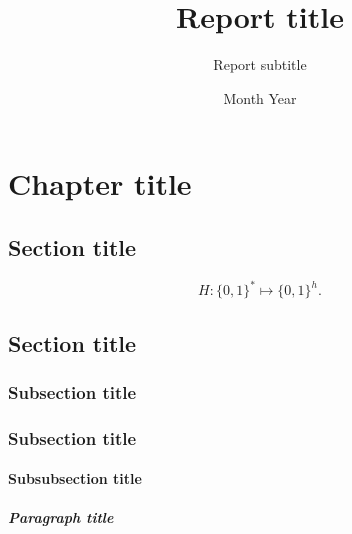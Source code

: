 \documentclass{enisareport}
\title{ Report title }
\subtitle{ Report subtitle }
\date{Month Year}
\theoremstyle{plain}
\theoremstyle{definition}
\begin{document}
\maketitle

\tableofcontents

\chapter{Chapter title}\label{chap1}

\lipsum[1]


\marginnote{%
  \lipsum[1][2]
} 

\section{Section title}\label{sec1.1}

\lipsum[1][4]
%
\begin{equation*}
  H : \{0,1\}^{*} \mapsto \{0,1\}^{h}.
  \end{equation*}
%
\lipsum[2][4]

\section{Section title}

\lipsum[3][1-6]

\subsection{Subsection title}

\lipsum[3][2-9]

\subsection{Subsection title}

\lipsum[3][2-9]

\subsubsection{Subsubsection title}

\lipsum[3][3-6]

\paragraph{Paragraph title}

\lipsum[3][1-4]
\end{document}
